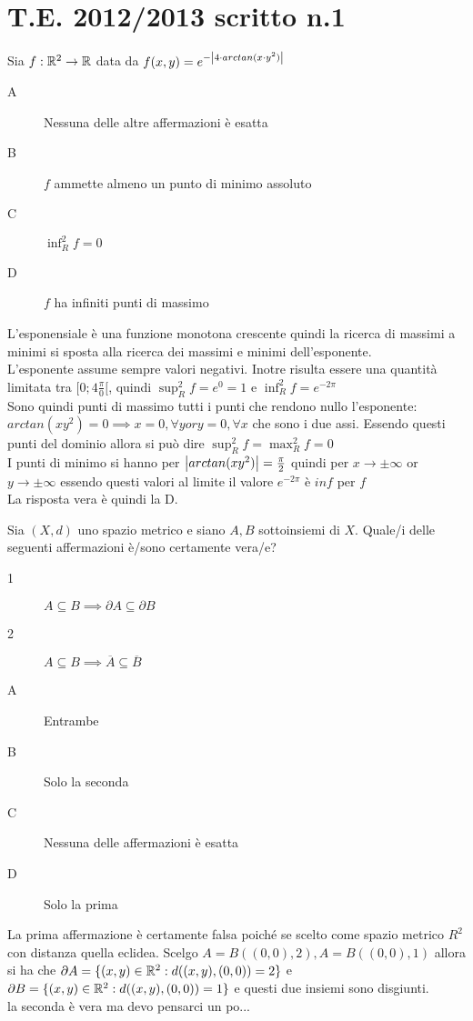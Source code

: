 \section{T.E. 2012/2013 scritto n.1}
\begin{exercise}
	Sia $f: \mathbb{R}^2 \to \mathbb{R}$ data da $f(x, y)=e^{-\left|4\cdot arctan(x\cdot y^2)\right|}$
	\begin{description}
		\item[A] Nessuna delle altre affermazioni è esatta
		\item[B] $f$ ammette almeno un punto di minimo assoluto
		\item[C] $\inf_R^2f = 0$
		\item[D] $f$ ha infiniti punti di massimo
	\end{description}
	L'esponensiale è una funzione monotona crescente quindi la ricerca di massimi a minimi si sposta alla ricerca dei massimi e minimi dell'esponente.\\
	L'esponente assume sempre valori negativi. Inotre risulta essere una quantità limitata tra $[0;4\frac{\pi}{0}[$, quindi $\sup_R^2f=e^0=1$ e $\inf_R^2f=e^{-2\pi}$\\
	Sono quindi punti di massimo tutti i punti che rendono nullo l'esponente: $arctan(xy^2)=0 \implies x=0,\forall y or y=0,\forall x$ che sono i due assi. Essendo questi punti del dominio allora si può dire $\sup_R^2f=\max_R^2f=0$\\
	I punti di minimo si hanno per $\left|arctan(xy^2)\right|=\frac{\pi}{2}$ quindi per $x \to \pm\infty$ or $y \to \pm\infty$ essendo questi valori al limite il valore $e^{-2\pi}$ è $inf$ per $f$\\
	La risposta vera è quindi la D.\\
\end{exercise}
\begin{exercise}
	Sia $(X,d)$ uno spazio metrico e siano $A, B$ sottoinsiemi di $X$. Quale/i delle seguenti affermazioni è/sono certamente vera/e?
	\begin{description}
		\item[1] $A\subseteq B \implies\partial A\subseteq \partial B$
		\item[2] $A\subseteq B \implies\overline{A}\subseteq\overline{B}$
	\end{description}
	\begin{description}
		\item[A] Entrambe
		\item[B] Solo la seconda
		\item[C] Nessuna delle affermazioni è esatta
		\item[D] Solo la prima
	\end{description}
	La prima affermazione è certamente falsa poiché se scelto come spazio metrico $R^2$ con distanza quella eclidea. Scelgo $A=B((0,0),2), A=B((0,0),1)$ allora si ha che $\partial A = \{(x,y)\in \mathbb{R}^2:d((x,y),(0,0))=2\}$ e $\partial B = \{(x,y)\in \mathbb{R}^2:d((x,y),(0,0))=1\}$ e questi due insiemi sono disgiunti.\\
	la seconda è vera ma devo pensarci un po...\\
\end{exercise}


\endgroup %
